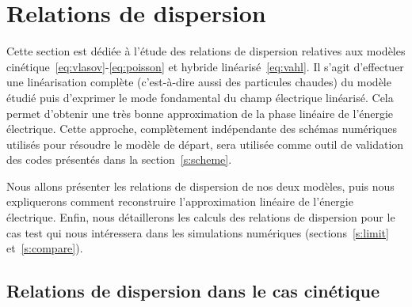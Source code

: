 
\section{Relations de dispersion}
\label{s:dispersion}

Cette section est dédiée à l'étude des relations de dispersion relatives aux modèles cinétique~\eqref{eq:vlasov}-\eqref{eq:poisson} et hybride linéarisé~\eqref{eq:vahl}. Il s'agit d'effectuer une linéarisation complète (c'est-à-dire aussi des particules chaudes) du modèle étudié puis d'exprimer le mode fondamental du champ électrique linéarisé. Cela permet d'obtenir une très bonne approximation de la phase linéaire de l'énergie électrique. Cette approche, complètement indépendante des schémas numériques utilisés pour résoudre le modèle de départ, sera utilisée comme outil de validation des codes présentés dans la section~\ref{s:scheme}.

Nous allons présenter les relations de dispersion de nos deux modèles, puis nous expliquerons comment reconstruire l'approximation linéaire de l'énergie électrique. Enfin, nous détaillerons les calculs des relations de dispersion pour le cas test qui nous intéressera dans les simulations numériques (sections~\ref{s:limit} et~\ref{s:compare}).

\subsection{Relations de dispersion dans le cas cinétique}

